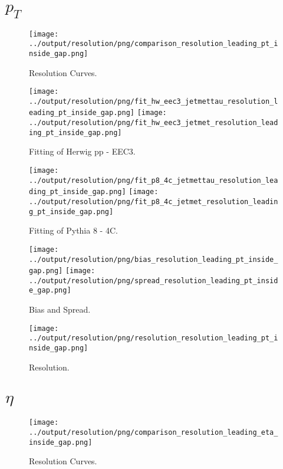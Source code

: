 \documentclass[11pt]{book}
\begin{document}
\section{$p_{T}$}

\begin{figure}[ht]
\centering
\texttt{[image: ../output/resolution/png/comparison\_resolution\_leading\_pt\_inside\_gap.png]}
\caption{Resolution Curves.}
\end{figure}


\begin{figure}[ht]
\centering
\texttt{[image: ../output/resolution/png/fit\_hw\_eec3\_jetmettau\_resolution\_leading\_pt\_inside\_gap.png]}
\texttt{[image: ../output/resolution/png/fit\_hw\_eec3\_jetmet\_resolution\_leading\_pt\_inside\_gap.png]}
\caption{Fitting of Herwig pp - EEC3.}
\end{figure}

\begin{figure}[ht]
\centering
\texttt{[image: ../output/resolution/png/fit\_p8\_4c\_jetmettau\_resolution\_leading\_pt\_inside\_gap.png]}
\texttt{[image: ../output/resolution/png/fit\_p8\_4c\_jetmet\_resolution\_leading\_pt\_inside\_gap.png]}
\caption{Fitting of Pythia 8 - 4C.}
\end{figure}

\begin{figure}[ht]
\centering
\texttt{[image: ../output/resolution/png/bias\_resolution\_leading\_pt\_inside\_gap.png]}
\texttt{[image: ../output/resolution/png/spread\_resolution\_leading\_pt\_inside\_gap.png]}
\caption{Bias and Spread.}
\end{figure}


\begin{figure}[ht]
\centering
\texttt{[image: ../output/resolution/png/resolution\_resolution\_leading\_pt\_inside\_gap.png]}
\caption{Resolution.}
\end{figure}
\clearpage

\section{$\eta$}

\begin{figure}[ht]
\centering
\texttt{[image: ../output/resolution/png/comparison\_resolution\_leading\_eta\_inside\_gap.png]}
\caption{Resolution Curves.}
\end{figure}
\end{document}
